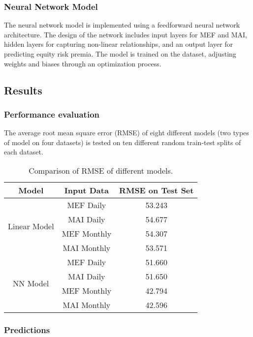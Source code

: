 \documentclass{article}
\begin{document}
\subsubsection{Neural Network Model}

The neural network model is implemented using a feedforward neural network architecture. The design of the network includes input layers for MEF and MAI, hidden layers for capturing non-linear relationships, and an output layer for predicting equity risk premia. The model is trained on the dataset, adjusting weights and biases through an optimization process.

\subsection{Results}

\subsubsection{Performance evaluation}

The average root mean square error (RMSE) of eight different models (two types of model on four datasets) is tested on ten different random train-test splits of each dataset.

\begin{table}[H]
\centering
\begin{tabular}{|c|c|c|}
\hline
\textbf{Model} & \textbf{Input Data} & \textbf{RMSE on Test Set} \\ \hline
\multirow{4}{*}{Linear Model} & MEF Daily & 53.243 \\ \cline{2-3} 
 & MAI Daily & 54.677 \\ \cline{2-3} 
 & MEF Monthly & 54.307 \\ \cline{2-3} 
 & MAI Monthly & 53.571 \\ \hline
\multirow{4}{*}{NN Model} & MEF Daily & 51.660 \\ \cline{2-3} 
 & MAI Daily & 51.650 \\ \cline{2-3} 
 & MEF Monthly & 42.794 \\ \cline{2-3} 
 & MAI Monthly & 42.596 \\ \hline
\end{tabular}
\caption{Comparison of RMSE of different models.}
\label{tab:RMSE}
\end{table}

\subsubsection{Predictions}
\end{document}
